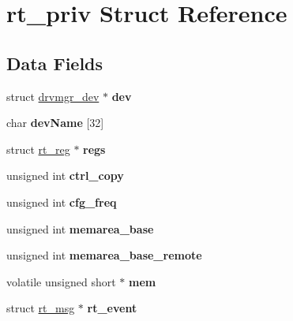 \hypertarget{structrt__priv}{}\section{rt\+\_\+priv Struct Reference}
\label{structrt__priv}
\subsection*{Data Fields}
\begin{DoxyCompactItemize}
\item 
\mbox{\label{structrt__priv_a8c803c143f1d177a4b3caaf8f533a5ab}} 
struct \mbox{\hyperlink{structdrvmgr__dev}{drvmgr\+\_\+dev}} $\ast$ {\bfseries dev}
\item 
\mbox{\label{structrt__priv_a5f09f3c0ea64de351f11ba87e494af84}} 
char {\bfseries dev\+Name} \mbox{[}32\mbox{]}
\item 
\mbox{\label{structrt__priv_a64dfddbe7c6746d9091ed2bebd64a3f4}} 
struct \mbox{\hyperlink{structrt__reg}{rt\+\_\+reg}} $\ast$ {\bfseries regs}
\item 
\mbox{\label{structrt__priv_ada50109e2a1eefcf9d36049ab5911ec6}} 
unsigned int {\bfseries ctrl\+\_\+copy}
\item 
\mbox{\label{structrt__priv_afd26ac44e0fd47e5d88f179722b6dd9a}} 
unsigned int {\bfseries cfg\+\_\+freq}
\item 
\mbox{\label{structrt__priv_a2fed9b8513cbf011078d6937e427cc19}} 
unsigned int {\bfseries memarea\+\_\+base}
\item 
\mbox{\label{structrt__priv_ac7ee421bc503f1d9bb2e5cf701cacfec}} 
unsigned int {\bfseries memarea\+\_\+base\+\_\+remote}
\item 
\mbox{\label{structrt__priv_a8ba24fe020b97cbf85a7d1233e3c64d8}} 
volatile unsigned short $\ast$ {\bfseries mem}
\item 
\mbox{\label{structrt__priv_ada8ddc627c9d7a4e68f9a48506c03ef8}} 
struct \mbox{\hyperlink{structrt__msg}{rt\+\_\+msg}} $\ast$ {\bfseries rt\+\_\+event}

\end{DoxyCompactItemize}

